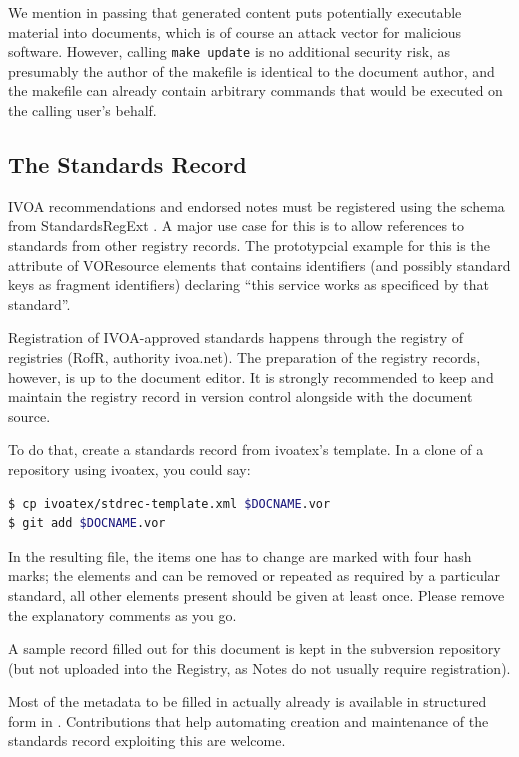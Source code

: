 \documentclass[11pt,a4paper]{ivoa}
\begin{document}
We mention in passing that generated content puts potentially executable
material into documents, which is of course an attack vector for
malicious software.  However, calling \texttt{make update} is no
additional security risk, as presumably the author of the makefile is
identical to the document author, and the makefile can already contain
arbitrary commands that would be executed on the calling user's behalf.

\subsection{The Standards Record}

IVOA recommendations and endorsed notes must be registered using the
schema from StandardsRegExt \citep{2012ivoa.spec.0508H}.  A major use
case for this is to allow references to standards from other registry
records. The prototypcial example for this is the 
attribute of VOResource  elements that contains
identifiers (and possibly standard keys as fragment identifiers)
declaring ``this service works as specificed by that standard''.

Registration of IVOA-approved standards happens through the registry of
registries (RofR, authority ivoa.net).  The preparation of the registry
records, however, is up to the document editor.  It is strongly
recommended to keep and maintain the registry record in version control
alongside with the document source.

To do that, create a standards record from ivoatex's template.  In a
clone of a repository using ivoatex, you could say:

\begin{lstlisting}[language=sh]
$ cp ivoatex/stdrec-template.xml $DOCNAME.vor
$ git add $DOCNAME.vor
\end{lstlisting}

In the resulting file, the items one has to change are marked with four
hash marks; the elements  and  can be removed
or repeated as required by a particular standard, all other elements
present should be given at least once.  Please remove the explanatory
comments as you go. 

A sample record filled out for this document is kept in the subversion
repository (but not uploaded into the Registry, as Notes do not usually
require registration).

Most of the metadata to be filled in actually already is available in
structured form in \ivoatex.  Contributions that help automating
creation and maintenance of the standards record exploiting this are welcome.
\end{document}
